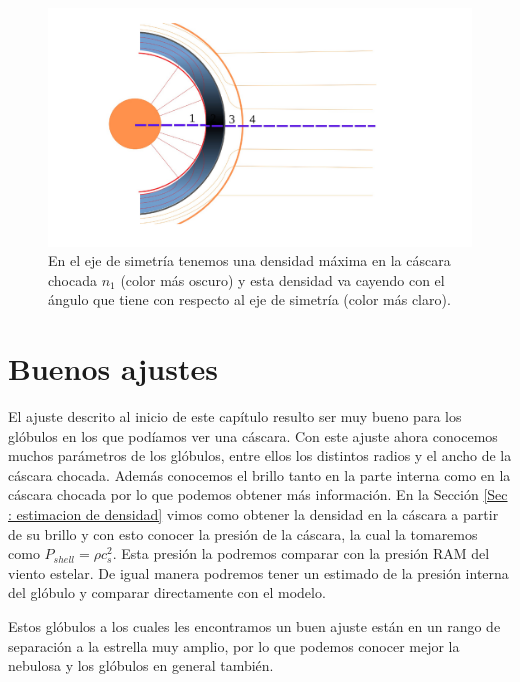 \documentclass{book}
\begin{document}
\begin{figure}[htb]
    \centering    \includegraphics[width=\textwidth]{Nuevas imagenes finales/densi_angle.pdf}
    \caption{En el eje de simetría tenemos una densidad máxima en la cáscara chocada $n_1$ (color más oscuro) y esta densidad va cayendo con el ángulo que tiene con respecto al eje de simetría (color más claro).}
    \label{fig:dens_angl}
\end{figure}


\section{Buenos ajustes}\label{Good results}

El ajuste descrito al inicio de este capítulo resulto ser muy bueno para los glóbulos en los que podíamos ver una cáscara. Con este ajuste ahora conocemos muchos parámetros de los glóbulos, entre ellos los distintos radios y el ancho de la cáscara chocada. Además conocemos el brillo tanto en la parte interna como en la cáscara chocada por lo que podemos obtener más información. En la Sección \ref{Sec : estimacion de densidad} vimos como obtener la densidad en la cáscara a partir de su brillo y con esto conocer la presión de la cáscara, la cual la tomaremos como $P_{shell}=\rho c_s^2$. Esta presión la podremos comparar con la presión RAM del viento estelar. De igual manera podremos tener un estimado de la presión interna del glóbulo y comparar directamente con el modelo.

Estos glóbulos a los cuales les encontramos un buen ajuste están en un rango de separación a la estrella muy amplio, por lo que podemos conocer mejor la nebulosa y los glóbulos en general también.
\end{document}
